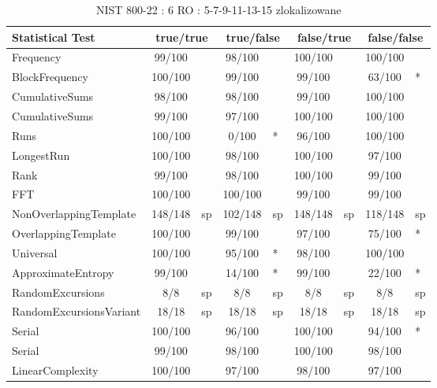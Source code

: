 \begin{table}[H]
\centering
\caption{NIST 800-22 : 6 RO : 5-7-9-11-13-15 zlokalizowane}
\label{tab:ch4_nist_22_6RO_60I_LOCALIZED}
\begin{tabular}{|l|c|l|c|l|c|l|c|l|}
\hline
\textbf{Statistical Test} & \multicolumn{2}{c|}{\textbf{true/true}} & \multicolumn{2}{c|}{\textbf{true/false}} & \multicolumn{2}{c|}{\textbf{false/true}} & \multicolumn{2}{c|}{\textbf{false/false}} \\ \hline
Frequency               &  99/100 &     &  98/100 &     & 100/100 &     & 100/100 &     \\ \hline
BlockFrequency          & 100/100 &     &  99/100 &     &  99/100 &     &  63/100 & *   \\ \hline
CumulativeSums          &  98/100 &     &  98/100 &     &  99/100 &     & 100/100 &     \\ \hline
CumulativeSums          &  99/100 &     &  97/100 &     & 100/100 &     & 100/100 &     \\ \hline
Runs                    & 100/100 &     &   0/100 & *   &  96/100 &     & 100/100 &     \\ \hline
LongestRun              & 100/100 &     &  98/100 &     & 100/100 &     &  97/100 &     \\ \hline
Rank                    &  99/100 &     &  98/100 &     & 100/100 &     &  99/100 &     \\ \hline
FFT                     & 100/100 &     & 100/100 &     &  99/100 &     &  99/100 &     \\ \hline
NonOverlappingTemplate  & 148/148 & sp  & 102/148 & sp  & 148/148 & sp  & 118/148 & sp  \\ \hline
OverlappingTemplate     & 100/100 &     &  99/100 &     &  97/100 &     &  75/100 & *   \\ \hline
Universal               & 100/100 &     &  95/100 & *   &  98/100 &     & 100/100 &     \\ \hline
ApproximateEntropy      &  99/100 &     &  14/100 & *   &  99/100 &     &  22/100 & *   \\ \hline
RandomExcursions        &     8/8 & sp  &     8/8 & sp  &     8/8 & sp  &     8/8 & sp  \\ \hline
RandomExcursionsVariant &   18/18 & sp  &   18/18 & sp  &   18/18 & sp  &   18/18 & sp  \\ \hline
Serial                  & 100/100 &     &  96/100 &     & 100/100 &     &  94/100 & *   \\ \hline
Serial                  &  99/100 &     &  98/100 &     & 100/100 &     &  98/100 &     \\ \hline
LinearComplexity        & 100/100 &     &  97/100 &     &  98/100 &     &  97/100 &     \\ \hline
\end{tabular}
\end{table}


